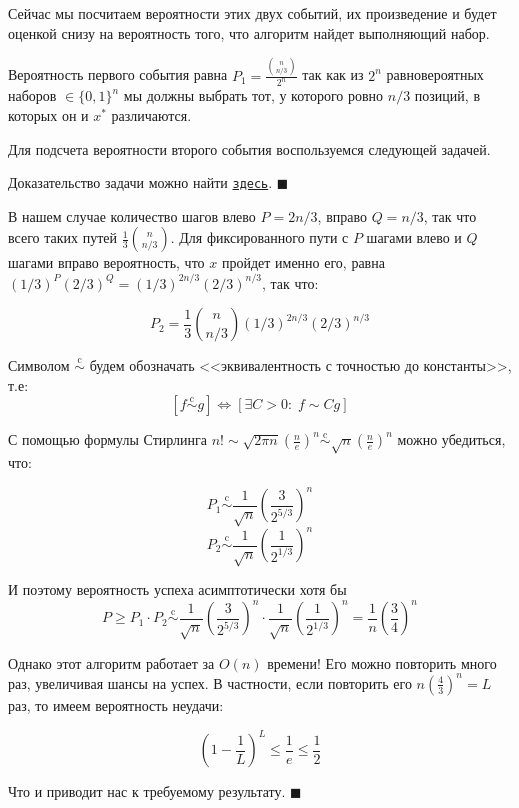 Сейчас мы посчитаем вероятности этих двух событий, их произведение и будет оценкой снизу на вероятность того, что алгоритм найдет выполняющий набор.

Вероятность первого события равна $P_1 = \frac{{n\choose{n/3}}}{2^n}$ так как из $2^n$ равновероятных наборов $\in \{0, 1\}^n$ мы должны выбрать тот, у которого ровно $n/3$ позиций, в которых он и $x^*$ различаются. 

Для подсчета вероятности второго события воспользуемся следующей задачей.


Доказательство задачи можно найти \href{https://drive.google.com/file/d/1KaZ5K6OAp6HiJGrxcBXQsNTa5yug4_FE/view?usp=sharing}{\texttt{здесь}}. $\blacksquare$

В нашем случае количество шагов влево $P = 2n/3$, вправо $Q=n/3$, так что всего таких путей $\frac{1}{3}{n\choose n/3}$. Для фиксированного пути с $P$ шагами влево и $Q$ шагами вправо вероятность, что $x$ пройдет именно его, равна $(1/3)^P (2/3)^Q = (1/3)^{2n/3} (2/3)^{n/3}$, так что:

$$P_2 = \frac{1}{3} {n\choose n/3} (1/3)^{2n/3} (2/3)^{n/3}$$

\newcommand{\scm}{\overset{\text{c}}{\sim}}
Символом $\scm$ будем обозначать <<эквивалентность с точностью до константы>>, т.е: $$[f \scm g] \iff [\exists C > 0: \; f \sim Cg]$$

С помощью формулы Стирлинга $n! \sim \sqrt{2\pi n}\left(\frac{n}{e}\right)^n \scm \sqrt{n}\left(\frac{n}{e}\right)^n$ можно убедиться, что:

$$ P_1 \scm \frac{1}{\sqrt n}\left(\frac{3}{2^{5/3}}\right)^n$$
$$ P_2 \scm \frac{1}{\sqrt n}\left(\frac{1}{2^{1/3}}\right)^n$$

И поэтому вероятность успеха асимптотически хотя бы 
$$P \geq P_1 \cdot P_2 \scm \frac{1}{\sqrt n}\left(\frac{3}{2^{5/3}}\right)^n \cdot \frac{1}{\sqrt n}\left(\frac{1}{2^{1/3}}\right)^n = \frac{1}{n}\left(\frac{3}{4}\right)^n$$

Однако этот алгоритм работает за $O(n)$ времени! Его можно повторить много раз, увеличивая шансы на успех. В частности, если повторить его $n\left(\frac{4}{3}\right)^n = L$ раз, то имеем вероятность неудачи:

$$\left(1-\frac{1}{L}\right)^L \leq \frac{1}{e} \leq \frac{1}{2}$$

Что и приводит нас к требуемому результату. $\blacksquare$












